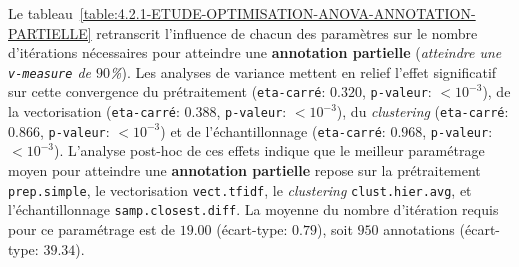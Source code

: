 			Le tableau~\ref{table:4.2.1-ETUDE-OPTIMISATION-ANOVA-ANNOTATION-PARTIELLE} retranscrit l'influence de chacun des paramètres sur le nombre d'itérations nécessaires pour atteindre une \textbf{annotation partielle} (\textit{atteindre une \texttt{v-measure} de $90$\%}).
			Les analyses de variance mettent en relief l'effet significatif sur cette convergence du prétraitement (\texttt{eta-carré}: $0.320$, \texttt{p-valeur}: $< 10^{-3}$), de la vectorisation (\texttt{eta-carré}: $0.388$, \texttt{p-valeur}: $< 10^{-3}$), du \textit{clustering} (\texttt{eta-carré}: $0.866$, \texttt{p-valeur}: $< 10^{-3}$) et de l'échantillonnage (\texttt{eta-carré}: $0.968$, \texttt{p-valeur}: $< 10^{-3}$).
			L'analyse post-hoc de ces effets indique que le meilleur paramétrage moyen pour atteindre une \textbf{annotation partielle} repose sur la prétraitement \texttt{prep.simple}, le vectorisation \texttt{vect.tfidf}, le \textit{clustering} \texttt{clust.hier.avg}, et l'échantillonnage \texttt{samp.closest.diff}. La moyenne du nombre d'itération requis pour ce paramétrage est de $19.00$ (écart-type: $0.79$), soit $950$ annotations (écart-type: $39.34$).
